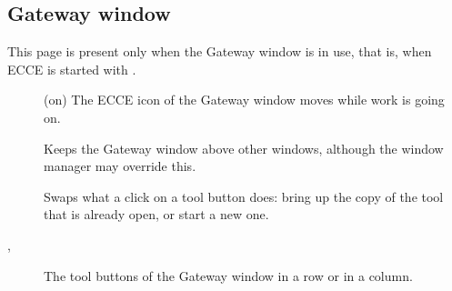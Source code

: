 \subsection*{Gateway window}
This page is present only when the Gateway window is in use, that is, when ECCE is started with .
\begin{description}
	\item[] (on) The ECCE icon of the Gateway window moves while work is going on.
	\item[] Keeps the Gateway window above other windows, although the window manager may override this.
	\item[] Swaps what a click on a tool button does: bring up the copy of the tool that is already open, or start a new one.
	\item[, ] The tool buttons of the Gateway window in a row or in a column.
\end{description}

